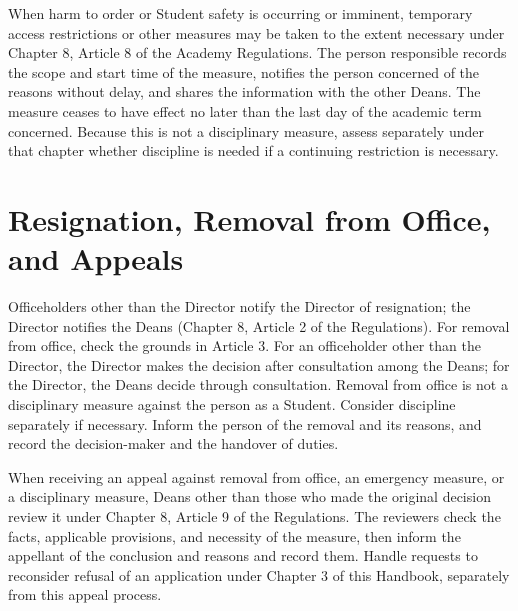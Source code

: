 When harm to order or Student safety is occurring or imminent, temporary access restrictions or other measures may be taken to the extent necessary under Chapter 8, Article 8 of the Academy Regulations.
The person responsible records the scope and start time of the measure, notifies the person concerned of the reasons without delay, and shares the information with the other Deans.
The measure ceases to have effect no later than the last day of the academic term concerned.
Because this is not a disciplinary measure, assess separately under that chapter whether discipline is needed if a continuing restriction is necessary.

\section{Resignation, Removal from Office, and Appeals}

Officeholders other than the Director notify the Director of resignation; the Director notifies the Deans (Chapter 8, Article 2 of the Regulations).
For removal from office, check the grounds in Article 3. For an officeholder other than the Director, the Director makes the decision after consultation among the Deans; for the Director, the Deans decide through consultation.
Removal from office is not a disciplinary measure against the person as a Student. Consider discipline separately if necessary.
Inform the person of the removal and its reasons, and record the decision-maker and the handover of duties.

When receiving an appeal against removal from office, an emergency measure, or a disciplinary measure, Deans other than those who made the original decision review it under Chapter 8, Article 9 of the Regulations.
The reviewers check the facts, applicable provisions, and necessity of the measure, then inform the appellant of the conclusion and reasons and record them.
Handle requests to reconsider refusal of an application under Chapter 3 of this Handbook, separately from this appeal process.
